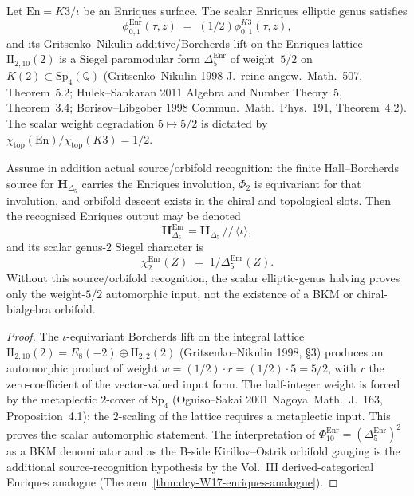 \begin{theorem}[Enriques Siegel weight $= 5/2$; conditional
$\mathbb{Z}/2$-orbifold recognition]
\label{thm:wac-W17-enriques-weight}
Let $\mathrm{En} = K3/\iota$ be an Enriques surface. The scalar
Enriques elliptic genus satisfies
\[
 \phi^{\mathrm{Enr}}_{0,1}(\tau, z)
 \;=\; (1/2)\phi_{0,1}^{K3}(\tau, z),
\]
and its Gritsenko--Nikulin additive/Borcherds lift on the Enriques
lattice $\mathrm{II}_{2,10}(2)$ is a Siegel paramodular form
$\Delta_5^{\mathrm{Enr}}$ of weight~$5/2$ on
$K(2)\subset\mathrm{Sp}_4(\mathbb{Q})$
(Gritsenko--Nikulin 1998 \textup{J.~reine angew.~Math.}~507,
Theorem~5.2; Hulek--Sankaran 2011
\textup{Algebra and Number Theory}~5, Theorem~3.4;
Borisov--Libgober 1998 \textup{Commun.~Math.~Phys.}~191,
Theorem~4.2). The scalar weight degradation $5\mapsto 5/2$
is dictated by
$\chi_{\mathrm{top}}(\mathrm{En})/\chi_{\mathrm{top}}(K3) = 1/2$.

Assume in addition actual source/orbifold recognition: the finite
Hall--Borcherds source for $\mathbf{H}_{\Delta_5}$ carries the
Enriques involution, $\Phi_2$ is equivariant for that involution, and
orbifold descent exists in the chiral and topological slots. Then the
recognised Enriques output may be denoted
\[
\mathbf{H}_{\Delta_5}^{\mathrm{Enr}}
= \mathbf{H}_{\Delta_5}\,/\!\!/\,\langle\iota\rangle,
\]
and its scalar genus-$2$ Siegel character is
\[
 \chi^{\mathrm{Enr}}_2(Z)
 \;=\;
 1/\Delta_5^{\mathrm{Enr}}(Z).
\]
Without this source/orbifold recognition, the scalar elliptic-genus
halving proves only the weight-$5/2$ automorphic input, not the
existence of a BKM or chiral-bialgebra orbifold.
\end{theorem}

\begin{proof}
The $\iota$-equivariant Borcherds lift on the integral lattice
$\mathrm{II}_{2,10}(2) = E_8(-2)\oplus\mathrm{II}_{2,2}(2)$
(Gritsenko--Nikulin 1998, \S 3) produces an automorphic product of
weight $w = (1/2)\cdot r = (1/2)\cdot 5 = 5/2$, with $r$ the
zero-coefficient of the vector-valued input form. The
half-integer weight is forced by the metaplectic $2$-cover of
$\mathrm{Sp}_4$ (Oguiso--Sakai 2001
\textup{Nagoya~Math.~J.}~163, Proposition~4.1): the $2$-scaling of
the lattice requires a metaplectic input. This proves the scalar
automorphic statement. The interpretation of
$\Phi_{10}^{\mathrm{Enr}} = (\Delta_5^{\mathrm{Enr}})^2$ as a BKM
denominator and as the B-side Kirillov--Ostrik orbifold gauging is
the additional source-recognition hypothesis
by the Vol.~III derived-categorical Enriques analogue
(Theorem~\ref{thm:dcy-W17-enriques-analogue}).
\end{proof}

